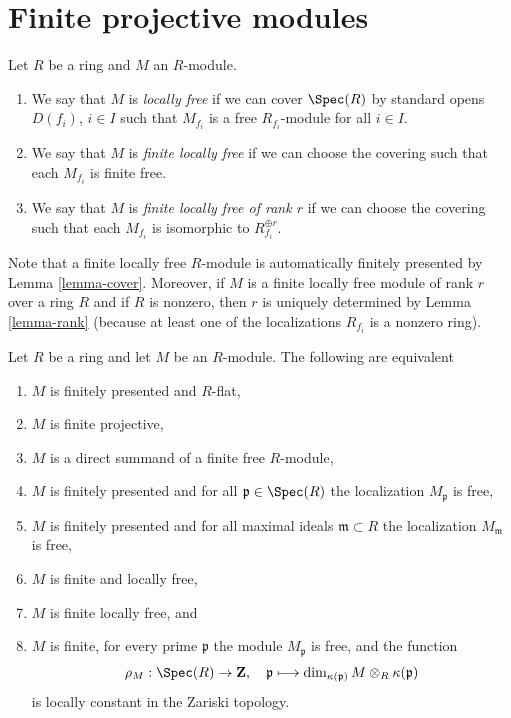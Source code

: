 \section{Finite projective modules}
\label{section-finite-projective-modules}

\begin{definition}
\label{definition-locally-free}
Let $R$ be a ring and $M$ an $R$-module.
\begin{enumerate}
\item We say that $M$ is {\it locally free} if we can cover $\Spec(R)$ by
standard opens $D(f_i)$, $i \in I$ such that $M_{f_i}$ is a free
$R_{f_i}$-module for all $i \in I$.
\item We say that $M$ is {\it finite locally free} if we can choose
the covering such that each $M_{f_i}$ is finite free.
\item We say that $M$ is {\it finite locally free of rank $r$}
if we can choose the covering such that each $M_{f_i}$ is isomorphic
to $R_{f_i}^{\oplus r}$.
\end{enumerate}
\end{definition}

\noindent
Note that a finite locally free $R$-module is automatically
finitely presented by Lemma \ref{lemma-cover}. Moreover, if $M$ is a
finite locally free module of rank $r$ over a ring $R$ and if
$R$ is nonzero, then $r$ is uniquely determined by
Lemma \ref{lemma-rank} (because at least one of the
localizations $	R_{f_i}$ is a nonzero ring).

\begin{lemma}
\label{lemma-finite-projective}
Let $R$ be a ring and let $M$ be an $R$-module.
The following are equivalent
\begin{enumerate}
\item $M$ is finitely presented and $R$-flat,
\item $M$ is finite projective,
\item $M$ is a direct summand of a finite free $R$-module,
\item $M$ is finitely presented and
for all $\mathfrak p \in \Spec(R)$ the
localization $M_{\mathfrak p}$ is free,
\item $M$ is finitely presented and
for all maximal ideals $\mathfrak m \subset R$ the
localization $M_{\mathfrak m}$ is free,
\item $M$ is finite and locally free,
\item $M$ is finite locally free, and
\item $M$ is finite, for every prime $\mathfrak p$ the module
$M_{\mathfrak p}$ is free, and the function
$$
\rho_M : \Spec(R) \to \mathbf{Z}, \quad
\mathfrak p
\longmapsto
\dim_{\kappa(\mathfrak p)} M \otimes_R \kappa(\mathfrak p)
$$
is locally constant in the Zariski topology.
\end{enumerate}
\end{lemma}

